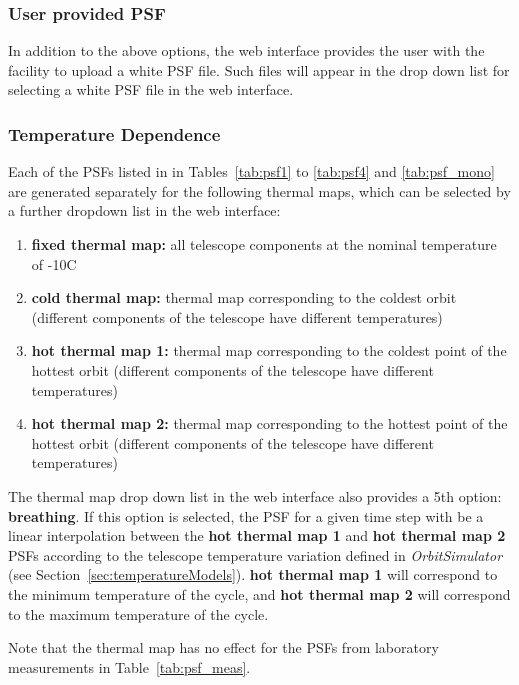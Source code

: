 \documentclass[11pt]{article}      %
\def\HCode#1{}
\def\htmlanchor#1{\HCode{<a id="#1"></a>}}
\begin{document}
\subsubsection{User provided PSF}

In addition to the above options, the web interface provides the user with the facility to upload a white PSF file. Such files will appear in the drop down list for selecting a white PSF file in the web interface.

\clearpage

\htmlanchor{psfTemperature}
\subsubsection{Temperature Dependence}
\label{sec:psfTemperature}

Each of the PSFs listed in in Tables~\ref{tab:psf1} to \ref{tab:psf4} and \ref{tab:psf_mono} are generated separately for the following thermal maps, which can be selected by a further dropdown list in the web interface:
\begin{enumerate}
\item {\bf fixed thermal map:} all telescope components at the nominal temperature of -10\textdegree C
\item {\bf cold thermal map:} thermal map corresponding to the coldest orbit (different components of the telescope have different temperatures)
\item {\bf hot thermal map 1:} thermal map corresponding to the coldest point of the hottest orbit (different components of the telescope have different temperatures)
\item {\bf hot thermal map 2:} thermal map corresponding to the hottest point of the hottest orbit (different components of the telescope have different temperatures)
\end{enumerate}

The thermal map drop down list in the web interface also provides a 5th option: {\bf breathing}. If this option is selected, the PSF for a given time step with be a linear interpolation between the  {\bf hot thermal map 1} and {\bf hot thermal map 2} PSFs according to the telescope temperature variation defined in {\it OrbitSimulator}  (see Section~\ref{sec:temperatureModels}). {\bf hot thermal map 1} will correspond to the minimum temperature of the cycle, and {\bf hot thermal map 2} will correspond to the maximum temperature of the cycle.

Note that the thermal map has no effect for the PSFs from laboratory measurements in Table~\ref{tab:psf_meas}.
\end{document}
